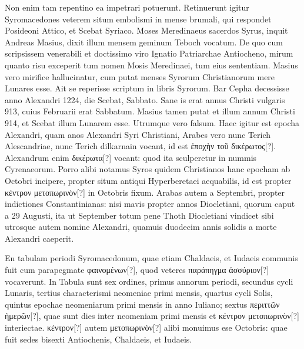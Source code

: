 %
Non enim tam repentino ea impetrari potuerunt.
Retinuerunt
igitur Syromacedones veterem situm embolismi in mense brumali,
qui respondet Posideoni Attico, et Scebat Syriaco.
Moses
Meredinaeus sacerdos Syrus, inquit Andreas Masius, dixit illum mensem
geminum Teboch vocatum.
De quo cum scripsissem venerabili et
doctissimo viro Ignatio Patriarchae Antiocheno, mirum quanto risu
exceperit tum nomen Mosis Meredinaei, tum eius sententiam.
Masius
vero mirifice hallucinatur, cum putat menses Syrorum Christianorum
mere Lunares esse.
Ait se reperisse scriptum in libris Syrorum.
Bar Cepha decessisse anno Alexandri 1224,
 die  Scebat, Sabbato.
Sane is erat annus Christi vulgaris 913, cuius 
 Februarii erat
Sabbatum.
Masius tamen putat et illum annum Christi 914, et Scebat
illum Lunarem esse.
Utrumque vero falsum.
Haec igitur est
epocha Alexandri, quam anos Alexandri Syri Christiani, Arabes
vero nunc Terich Alescandriae, nunc Terich dilkarnain vocant, id est
\textgreek{ἐποχὴν τοῦ δικέρωτος[?]}.
Alexandrum enim \textgreek{δικέρωτα[?]} vocant: quod ita sculperetur
in nummis Cyrenaeorum.
Porro alibi notamus Syros quidem
Christianos hanc epocham ab Octobri incipere, propter situm antiqui
Hyperberetaei aequabilis, id est propter
 \textgreek{κέντρον μετοπωρινὸν[?]} in 
Octobris fixum.
Arabas autem a Septembri, propter indictiones Constantinianas:
nisi mavis propter annos Diocletiani, quorum caput a 29
Augusti, ita ut September totum pene Thoth Diocletiani vindicet sibi
utrosque autem nomine Alexandri, quamuis duodecim annis solidis
a morte Alexandri caeperit.
%
\begin{table}[htbp]
 
\end{table}
%
En tabulam periodi Syromacedonum, quae etiam Chaldaeis, et
Iudaeis communis fuit cum parapegmate \textgreek{φαινομένων[?]}, quod veteres
\textgreek{παράπηγμα ἀσσύριον[?]} vocaverunt.
In Tabula sunt sex ordines, primus
annorum periodi, secundus cycli Lunaris, tertius characterismi neomeniae
primi mensis, quartus cycli Solis, quintus epochae neomeniarum
primi mensis in anno Iuliano; sextus \textgreek{περιττῶν ἡμερῶν[?]}, quae sunt
dies inter neomeniam primi mensis et
 \textgreek{κέντρον μετοπωρινὸν[?]} interiectae.
%
\textgreek{κέντρον[?]} autem \textgreek{μετοπωρινὸν[?]}
 alibi monuimus ese  Octobris: quae fuit
sedes bisexti Antiochenis, Chaldaeis, et Iudaeis.
%
